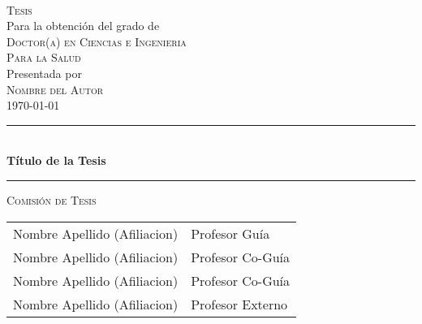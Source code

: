 
\begin{titlepage}
    \mbox{}\vspace{5\baselineskip}\\ %
    \rmfamily\large %
    \centering 
    \textsc{Tesis} \\ [2ex]
    Para la obtención del grado de \\ [2ex]
    \textsc{Doctor(a) en Ciencias e Ingenieria \\ Para la Salud} \\ [2ex]
    Presentada por \\ [1ex]
    \textsc{Nombre del Autor} \\ [2ex]
    \today \\
    \vspace{1\baselineskip}
    \rule{0.35\textwidth}{0.5pt} \\
    \vspace{1\baselineskip}
    {%
    \rmfamily\Large\bfseries %
    Título de la Tesis
    }\\
    \vspace{1\baselineskip}
    \rule{0.35\textwidth}{0.5pt}
    \vfill
    \textsc{Comisión de Tesis} \\ [2ex] 
    \begin{tabular}{ll}
        Nombre Apellido (Afiliacion) & Profesor Guía \\
        Nombre Apellido (Afiliacion) & Profesor Co-Guía \\
        Nombre Apellido (Afiliacion) & Profesor Co-Guía \\
        Nombre Apellido (Afiliacion) & Profesor Externo \\
    \end{tabular}
\end{titlepage}